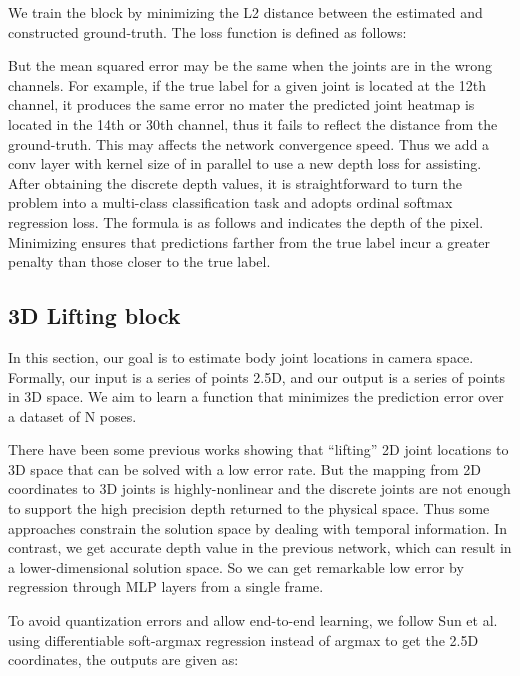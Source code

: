 \documentclass[letterpaper]{article} \usepackage{aaai21}  \usepackage{times}  \usepackage{helvet} \usepackage{courier}  \usepackage[hyphens]{url}  \usepackage{graphicx} \urlstyle{rm} \def\UrlFont{\rm}  \usepackage{natbib}  \usepackage{caption} \frenchspacing  \setlength{\pdfpagewidth}{8.5in}  \setlength{\pdfpageheight}{11in}
\begin{document}
We train the block by minimizing the L2 distance between the estimated and constructed ground-truth. The loss function  is defined as follows:



But the mean squared error may be the same when the joints are in the wrong channels. For example, if the true label for a given joint is located at the 12th channel, it produces the same error no mater the predicted joint heatmap is located in the 14th or 30th channel, thus it fails to reflect the distance from the ground-truth. This may affects the network convergence speed. Thus we add a conv layer with kernel size of  in parallel to use a new depth loss for assisting. After obtaining the discrete depth values, it is straightforward to turn the problem into a multi-class classification task and adopts ordinal softmax regression loss. The  formula is as follows and  indicates the depth of the pixel. Minimizing  ensures that predictions farther from the true label incur a greater penalty than those closer to the true label. 









\subsection{3D Lifting block}
\label{sec4}
In this section, our goal is to estimate body joint locations in camera space. Formally, our input is a series of points  2.5D, and our output is a series of points  in 3D space. We aim to learn a function that minimizes the prediction error over a dataset of N poses.



There have been some previous works showing that “lifting” 2D joint locations to 3D space that can be solved with a low error rate. But the mapping from 2D coordinates to 3D joints is highly-nonlinear and the discrete joints are not enough to support the high precision depth returned to the physical space. Thus some approaches constrain the solution space by dealing with temporal information. In contrast, we get accurate depth value in the previous network, which can result in a lower-dimensional solution space. So we can get remarkable low error by regression through MLP layers from a single frame.


To avoid quantization errors and allow end-to-end learning, we follow Sun et al. using differentiable soft-argmax regression instead of argmax to get the 2.5D coordinates, the outputs are given as:
\end{document}

